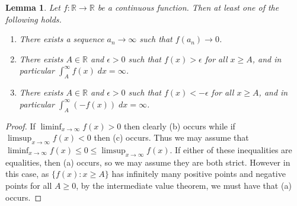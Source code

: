 \documentclass[aos]{imsart}
\newcommand{\R}{\mathbb{R}}
\newtheorem{lemma}[theorem]{Lemma}
\begin{document}
	\begin{lemma}
		\label{lem:boundaryconvergent}
		Let $f:\R\to\R$ be a continuous function. Then at least one of the following holds.
		\begin{enumerate}[label=(\alph*)]
			\item There exists a sequence $a_n \to \infty$ such that $f(a_n) \to 0$.
			\item There exists $A\in\R$ and $\epsilon > 0$ such that $f(x) >\epsilon$ for all $x\geq A$, and in particular $\int_A^\infty f(x)\;dx = \infty$.
			\item There exists $A\in\R$ and $\epsilon > 0$ such that $f(x) <-\epsilon $ for all $x\geq A$, and in particular $\int_A^\infty (-f(x))\;dx = \infty$.
		\end{enumerate}
	\end{lemma}
	\begin{proof}
		If $\liminf_{x \to \infty} f(x) > 0$ then clearly (b) occurs while if $\limsup_{x \to \infty} f(x) < 0$ then (c) occurs. Thus we may assume that $\liminf_{x \to \infty} f(x) \leq 0 \leq \limsup_{x \to \infty} f(x)$. If either of these inequalities are equalities, then (a) occurs, so we may assume they are both strict. However in this case, as $\{f(x) : x \geq A\}$ has infinitely many positive points and negative points for all $A \geq 0$, by the intermediate value theorem, we must have that (a) occurs.
	\end{proof}
	
\end{document}

